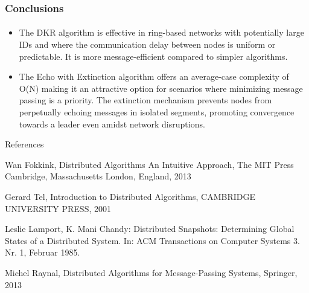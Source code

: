 \documentclass[11pt]{beamer}              %
\begin{document}
\begin{frame}
\frametitle{Conclusions}
\framesubtitle{}
\begin{itemize}
\item The DKR algorithm is effective in ring-based networks with potentially large IDs and where the communication delay between nodes is uniform or predictable. It is more message-efficient compared to simpler algorithms. 
\item The Echo with Extinction algorithm offers an average-case complexity of O(N) making it an attractive option for scenarios where minimizing message passing is a priority. 
The extinction mechanism prevents nodes from perpetually echoing messages in isolated segments, promoting convergence towards a leader even amidst network disruptions.


\end{itemize}

\end{frame}


\begin{frame}{References}

Wan Fokkink, Distributed Algorithms An Intuitive Approach, The MIT Press Cambridge, Massachusetts London, England, 2013
\item Gerard Tel, Introduction to Distributed Algorithms, CAMBRIDGE UNIVERSITY PRESS, 2001
\item Leslie Lamport, K. Mani Chandy: Distributed Snapshots: Determining Global States of a Distributed System. In: ACM Transactions on Computer Systems 3. Nr. 1, Februar 1985.
\item Michel Raynal, Distributed Algorithms for Message-Passing Systems, Springer, 2013


\end{frame}
\end{document}

